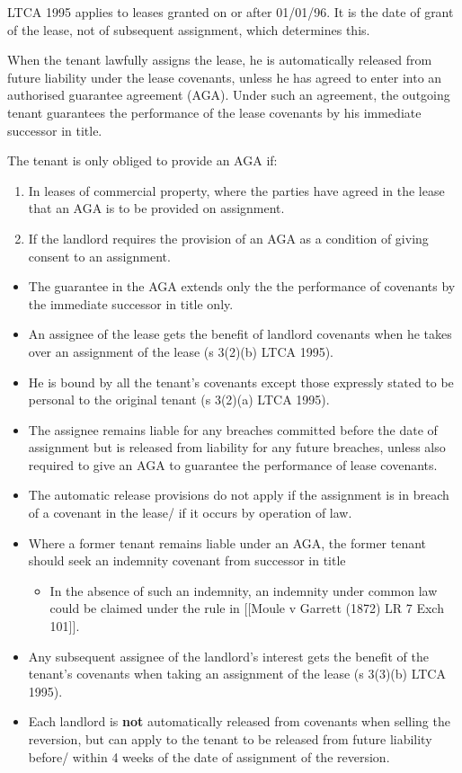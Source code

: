 \documentclass[
]{article}
\providecommand{\tightlist}{%
  \setlength{\itemsep}{0pt}\setlength{\parskip}{0pt}}
\begin{document}
LTCA 1995 applies to leases granted on or after 01/01/96. It is the date
of grant of the lease, not of subsequent assignment, which determines
this.

When the tenant lawfully assigns the lease, he is automatically released
from future liability under the lease covenants, unless he has agreed to
enter into an authorised guarantee agreement (AGA). Under such an
agreement, the outgoing tenant guarantees the performance of the lease
covenants by his immediate successor in title.

The tenant is only obliged to provide an AGA if:

\begin{enumerate}
\def\labelenumi{\arabic{enumi}.}
\tightlist
\item
  In leases of commercial property, where the parties have agreed in the
  lease that an AGA is to be provided on assignment.
\item
  If the landlord requires the provision of an AGA as a condition of
  giving consent to an assignment.
\end{enumerate}

\begin{itemize}
\tightlist
\item
  The guarantee in the AGA extends only the the performance of covenants
  by the immediate successor in title only.
\item
  An assignee of the lease gets the benefit of landlord covenants when
  he takes over an assignment of the lease (s 3(2)(b) LTCA 1995).
\item
  He is bound by all the tenant's covenants except those expressly
  stated to be personal to the original tenant (s 3(2)(a) LTCA 1995).
\item
  The assignee remains liable for any breaches committed before the date
  of assignment but is released from liability for any future breaches,
  unless also required to give an AGA to guarantee the performance of
  lease covenants.
\item
  The automatic release provisions do not apply if the assignment is in
  breach of a covenant in the lease/ if it occurs by operation of law.
\item
  Where a former tenant remains liable under an AGA, the former tenant
  should seek an indemnity covenant from successor in title

  \begin{itemize}
  \tightlist
  \item
    In the absence of such an indemnity, an indemnity under common law
    could be claimed under the rule in {[}{[}Moule v Garrett (1872) LR 7
    Exch 101{]}{]}.
  \end{itemize}
\item
  Any subsequent assignee of the landlord's interest gets the benefit of
  the tenant's covenants when taking an assignment of the lease (s
  3(3)(b) LTCA 1995).
\item
  Each landlord is \textbf{not} automatically released from covenants
  when selling the reversion, but can apply to the tenant to be released
  from future liability before/ within 4 weeks of the date of assignment
  of the reversion.
\end{itemize}
\end{document}

